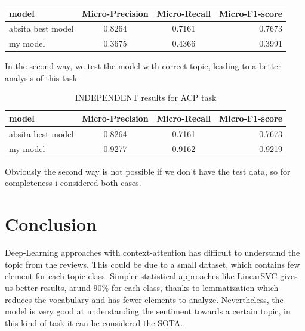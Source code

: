 \documentclass{article}
\begin{document}
\begin{itemize}
\begin{table}[h!]
\begin{center}
                        \begin{tabular}{l|c|c|r}
                            \textbf{model} & \textbf{Micro-Precision} & \textbf{Micro-Recall} & \textbf{Micro-F1-score}\\
                            \hline
                                absita best model & 0.8264 & 0.7161 & 0.7673\\
                                my model & 0.3675 & 0.4366 & 0.3991\\
                        \end{tabular}
                    \end{center}
                \end{table}
                In the second way, we test the model with correct topic, leading to a better analysis of this task
                \begin{table}[h!]
                    \begin{center}
                        \caption{INDEPENDENT results for ACP task}
                        \label{tab:table4}
                        \begin{tabular}{l|c|c|r}
                            \textbf{model} & \textbf{Micro-Precision} & \textbf{Micro-Recall} & \textbf{Micro-F1-score}\\
                            \hline
                                absita best model & 0.8264 & 0.7161 & 0.7673\\
                                my model & 0.9277 & 0.9162 & 0.9219\\
                        \end{tabular}
                    \end{center}
                \end{table}
        \end{itemize}
        Obviously the second way is not possible if we don't have the test data, so for completeness i considered both cases.



    \section{Conclusion}\label{sec:s6}
        Deep-Learning approaches with context-attention has difficult to understand the topic from the reviews.
        This could be due to a small dataset, which contains few element for each topic class.
        Simpler statistical approaches like LinearSVC gives us better results, arund 90\% for each class, thanks to lemmatization which reduces the vocabulary and has fewer elements to analyze.
        Nevertheless, the model is very good at understanding the sentiment towards a certain topic, in this kind of task it can be considered the SOTA.
\end{document}
